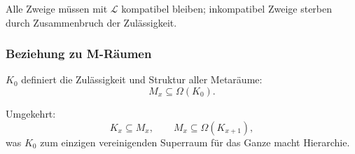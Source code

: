 Alle Zweige müssen mit $\mathcal{L}$ kompatibel bleiben; inkompatibel
Zweige sterben durch Zusammenbruch der Zulässigkeit.

\subsubsection{Beziehung zu M-Räumen}

$K_0$ definiert die Zulässigkeit und Struktur aller Metaräume:
\[
M_x \subseteq \Omega(K_0).
\]

Umgekehrt:
\[
K_x \subseteq M_x,
\qquad
M_x \subseteq \Omega(K_{x+1}),
\]
was $K_0$ zum einzigen vereinigenden Superraum für das Ganze macht
Hierarchie.
